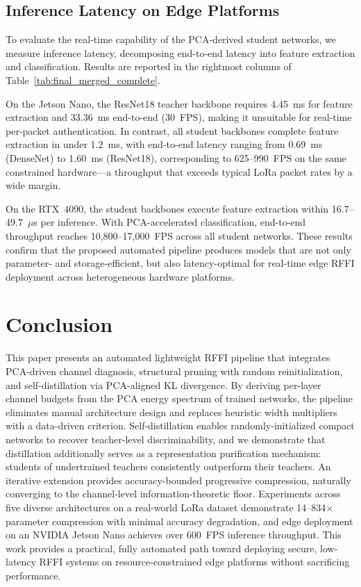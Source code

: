 \documentclass[10pt, conference]{IEEEtran}
\begin{document}
\subsection{Inference Latency on Edge Platforms}

To evaluate the real-time capability of the PCA-derived student networks, we measure inference latency, decomposing end-to-end latency into feature extraction and classification.
Results are reported in the rightmost columns of Table~\ref{tab:final_merged_complete}.

On the Jetson Nano, the ResNet18 teacher backbone requires 4.45~ms for feature extraction and 33.36~ms end-to-end (30~FPS), making it unsuitable for real-time per-packet authentication.
In contrast, all student backbones complete feature extraction in under 1.2~ms, with end-to-end latency ranging from 0.69~ms (DenseNet) to 1.60~ms (ResNet18), corresponding to 625--990~FPS on the same constrained hardware---a throughput that exceeds typical LoRa packet rates by a wide margin.

On the RTX~4090, the student backbones execute feature extraction within 16.7--49.7~$\mu$s per inference.
With PCA-accelerated classification, end-to-end throughput reaches 10,800--17,000~FPS across all student networks.
These results confirm that the proposed automated pipeline produces models that are not only parameter- and storage-efficient, but also latency-optimal for real-time edge RFFI deployment across heterogeneous hardware platforms.


\section{Conclusion}
\label{sec:conclusion}
This paper presents an automated lightweight RFFI pipeline that integrates PCA-driven channel diagnosis, structural pruning with random reinitialization, and self-distillation via PCA-aligned KL divergence.
By deriving per-layer channel budgets from the PCA energy spectrum of trained networks, the pipeline eliminates manual architecture design and replaces heuristic width multipliers with a data-driven criterion.
Self-distillation enables randomly-initialized compact networks to recover teacher-level discriminability, and we demonstrate that distillation additionally serves as a representation purification mechanism: students of undertrained teachers consistently outperform their teachers.
An iterative extension provides accuracy-bounded progressive compression, naturally converging to the channel-level information-theoretic floor.
Experiments across five diverse architectures on a real-world LoRa dataset demonstrate 14--834$\times$ parameter compression with minimal accuracy degradation, and edge deployment on an NVIDIA Jetson Nano achieves over 600~FPS inference throughput.
This work provides a practical, fully automated path toward deploying secure, low-latency RFFI systems on resource-constrained edge platforms without sacrificing performance.




\end{document}
